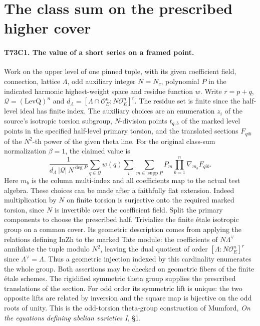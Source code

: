 \section{The class sum on the prescribed higher cover}

\paragraph{T73C1. The value of a short series on a framed point.}
Work on the upper level of one pinned tuple, with its given coefficient field,
connection, lattice $\Lambda$, odd auxiliary integer $N=N_c$, polynomial
$P$ in the indicated harmonic highest-weight space and residue function $w$.
Write $r=p+q$, $\mathcal Q=(\mathrm{LevQ})^n$ and
$d_\Lambda=[\Lambda\cap\mathcal O_E^n:N\mathcal O_E^n]^r$.
The residue set is finite since the half-level ideal has finite index.
The auxiliary choices are an enumeration $z_i$ of the source's isotropic
torsion subgroup, $N$-division points $t_{q,b}$ of the marked level
points in the specified half-level primary torsion, and the translated
sections $F_{qib}$ of the $N^2$-th power of the given theta line.
For the original class-sum normalization $\beta=1$, the claimed value is
\[
 \frac{1}{d_\Lambda\,|\mathcal Q|\,N^{\deg P}}
 \sum_{q\in\mathcal Q} w(q)
 \sum_i\sum_{m\in\operatorname{supp} P} P_m
       \prod_{b=1}^n \nabla_{m_b}F_{qib}.
\]
Here $m_b$ is the column multi-index and all coefficients map to the
actual test algebra. These choices can be made after a faithfully
flat extension. Indeed multiplication by $N$ on finite torsion is
surjective onto the required marked torsion, since $N$ is invertible
over the coefficient field. Split the primary components to choose
the prescribed half. Trivialize the finite étale isotropic group on
a common cover. Its geometric description comes from applying the
relations defining $\mathrm{InZh}$ to the marked Tate module:
the coefficients of $N\Lambda^\vee$ annihilate the tuple modulo
$N^2$, leaving the dual quotient of order
$[\Lambda:N\mathcal O_E^n]^r$ since $\Lambda^\vee=\Lambda$.
Thus a geometric injection indexed by this cardinality enumerates
the whole group. Both assertions may be checked on geometric fibers
of the finite étale schemes. The rigidified symmetric theta group
supplies the prescribed translations of the section. For odd order
its symmetric lift is unique: the two opposite lifts are related by
inversion and the square map is bijective on the odd roots of unity.
This is the odd-torsion theta-group construction of Mumford,
\emph{On the equations defining abelian varieties I}, \S1.

